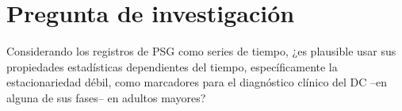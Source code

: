 %
%


\section{Pregunta de investigaci\'on}

Considerando los registros de PSG como series de tiempo,
¿es plausible usar sus propiedades estad\'isticas dependientes del tiempo, espec\'ificamente
la estacionariedad d\'ebil,
como marcadores para el diagn\'ostico cl\'inico del DC --en alguna de 
sus fases-- en adultos mayores?

